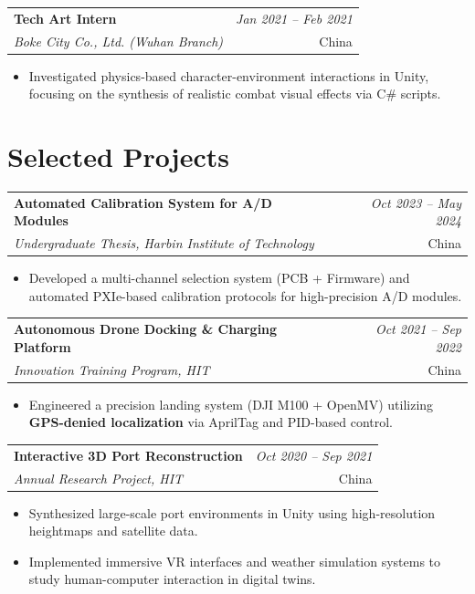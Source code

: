 \documentclass[11pt]{article}
\makeatletter
\newenvironment{cvitems}{%
  \setlength{\parskip}{0pt}%
\begin{itemize}[leftmargin=*, itemsep=0.1em, topsep=0em, partopsep=0em, parsep=0pt]}{
  \end{itemize}}
\newcommand{\cventry}[4]{%
  \noindent
  \begin{tabular*}{\textwidth}{@{}p{0.75\textwidth}@{\extracolsep{\fill}}r@{}}
    \textbf{#1} & \textit{#4} \\
    \textit{#2} & #3 \\
  \end{tabular*}
  \vspace{-0.4em}
}
\makeatother
\begin{document}
\cventry{Tech Art Intern}{Boke City Co., Ltd. (Wuhan Branch)}{China}{Jan 2021 -- Feb 2021}
\begin{cvitems}
\item Investigated physics-based character-environment interactions in Unity, focusing on the synthesis of realistic combat visual effects via C\# scripts.
\end{cvitems}

\section{Selected Projects}

\cventry{Automated Calibration System for A/D Modules}{Undergraduate Thesis, Harbin Institute of Technology}{China}{Oct 2023 -- May 2024}
\begin{cvitems}
\item Developed a multi-channel selection system (PCB + Firmware) and automated PXIe-based calibration protocols for high-precision A/D modules.
\end{cvitems}

\cventry{Autonomous Drone Docking \& Charging Platform}{Innovation Training Program, HIT}{China}{Oct 2021 -- Sep 2022}
\begin{cvitems}
\item Engineered a precision landing system (DJI M100 + OpenMV) utilizing \textbf{GPS-denied localization} via AprilTag and PID-based control.
\end{cvitems}

\cventry{Interactive 3D Port Reconstruction}{Annual Research Project, HIT}{China}{Oct 2020 -- Sep 2021}
\begin{cvitems}
\item Synthesized large-scale port environments in Unity using high-resolution heightmaps and satellite data.
\item Implemented immersive VR interfaces and weather simulation systems to study human-computer interaction in digital twins.
\end{cvitems}

\end{document}
